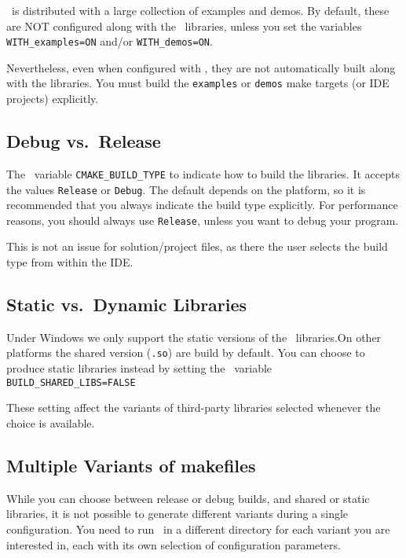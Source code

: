 \cgal\ is distributed with a large collection of examples and demos. By default, these are NOT configured along with
the \cgal\ libraries, unless you set the variables {\tt WITH\_examples=ON} and/or {\tt WITH\_demos=ON}.

Nevertheless, even when configured with \cgal, they are not automatically built along with the libraries.
You must build the \texttt{examples} or \texttt{demos} make targets (or IDE projects) explicitly.

\subsection{Debug vs.\ Release}

The \cmake\ variable \texttt{CMAKE\_BUILD\_TYPE} to indicate how to build
the libraries. It accepts the values \texttt{Release} or
\texttt{Debug}. The default depends on the platform, so it is recommended
that you always indicate the build type explicitly. For performance
reasons, you should always use \texttt{Release}, unless you want to debug
your program.

This is not an issue for solution/project files, as there the user selects the build type from within the IDE.

\subsection{Static vs.\ Dynamic Libraries }

Under Windows we only support  the static versions of the \cgal\ libraries.On other platforms
the shared version ({\tt .so}) are build by default.
You can choose to produce static libraries instead by setting the \cmake\ variable {\tt BUILD\_SHARED\_LIBS=FALSE} 

These setting affect the variants of third-party libraries selected whenever the choice is available.

\subsection{Multiple Variants of makefiles}\label{sec:cmake-out-of-source}

While you can choose between release or debug builds, and shared or static libraries,
it is not possible to generate different variants during a single configuration. You need to run \cmake\ in a 
different directory for each variant you are interested in, each with its own selection of configuration parameters.

